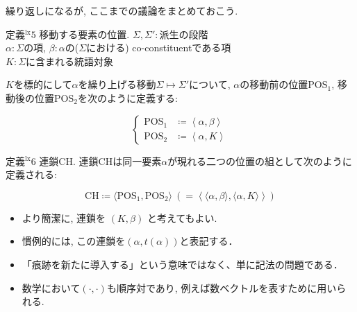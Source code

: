 \documentclass[dvipdfmx, xcolor={dvipsnames},12pt]{beamer}
\begin{document}
\begin{frame}
繰り返しになるが, ここまでの議論をまとめておこう.

\begin{Def}{定義$^\text{lx}5$ 移動する要素の位置.}
$\Sigma, \Sigma'\colon$派生の段階\\
$\alpha\colon\Sigma$の項, $\beta\colon\alpha$の($\Sigma$における) co-constituentである項\\
$K\colon\Sigma$に含まれる統語対象

\vspace{0.5em}

$K$を標的にして$\alpha$を繰り上げる移動$\Sigma\mapsto \Sigma'$について, $\alpha$の移動前の位置$\mathrm{POS}_1$, 移動後の位置$\mathrm{POS}_2$を次のように定義する$\colon$

\[
\left\{
\begin{aligned}
\mathrm{POS}_1 &\coloneq \left\langle \alpha, \beta \right\rangle \\
\mathrm{POS}_2 &\coloneq \left\langle \alpha, K \right\rangle 
\end{aligned}
\right.
\]

\end{Def}
\end{frame}


\begin{frame}


\begin{Def}{定義$^\text{lx}6$ 連鎖$\mathrm{CH}$.}
連鎖$\mathrm{CH}$は同一要素$\alpha$が現れる二つの位置の組として次のように定義される$\colon$

\[
\mathrm{CH} \coloneq \langle \text{POS}_1, \text{POS}_2 \rangle\: \left(= \left\langle \langle \alpha, \beta \rangle,  \langle \alpha, K \rangle\right\rangle\right)
\]
\end{Def}

\medskip
\begin{itemize}
\item より簡潔に, 連鎖を $(K, \beta)$ と考えてもよい.
\item 慣例的には, この連鎖を$(\alpha, t(\alpha))$と表記する．
\end{itemize}

\begin{marker}
\begin{itemize}
\item 「痕跡を新たに導入する」という意味ではなく、単に記法の問題である．
\item 数学において$(\cdot, \cdot)$も順序対であり, 例えば数ベクトルを表すために用いられる.
\end{itemize}
\end{marker}

\end{frame}
\end{document}
